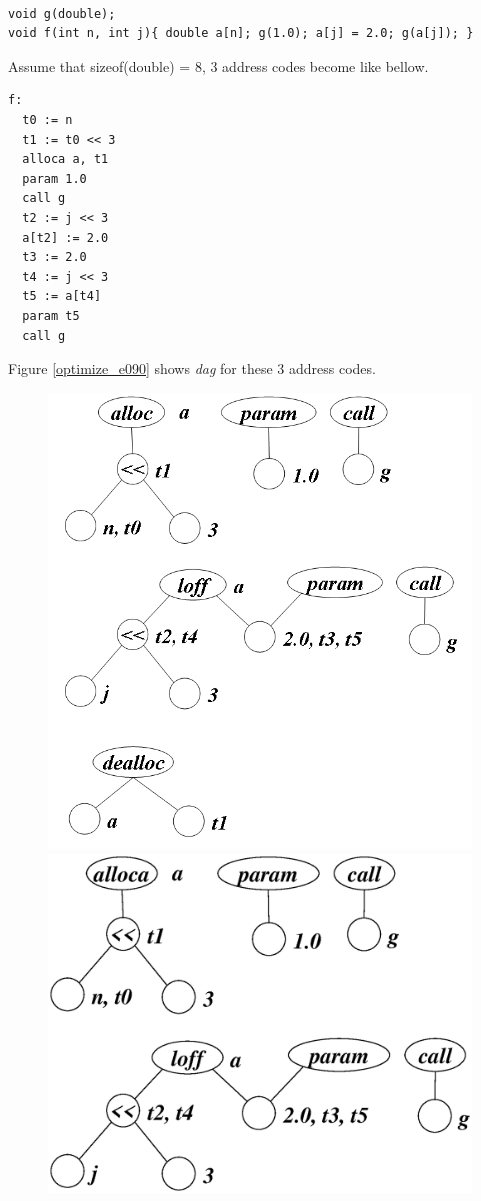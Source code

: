 \begin{Example}
\label{optimize_e089}
\begin{verbatim}

void g(double);
void f(int n, int j){ double a[n]; g(1.0); a[j] = 2.0; g(a[j]); }
\end{verbatim}
Assume that 
sizeof(double) = 8, 3 address codes become like bellow.
\begin{verbatim}
f:
  t0 := n
  t1 := t0 << 3
  alloca a, t1
  param 1.0
  call g
  t2 := j << 3
  a[t2] := 2.0
  t3 := 2.0
  t4 := j << 3
  t5 := a[t4]
  param t5
  call g
\end{verbatim}
Figure \ref{optimize_e090} shows {\em dag} for these 3 address codes.
\begin{figure}[htbp]
\begin{center}
\begin{htmlonly}
\includegraphics[width=0.392\linewidth,height=0.5\linewidth]{opt038.png}
\end{htmlonly}
\begin{latexonly}
\includegraphics[width=1.2\linewidth,height=1.0\linewidth]{opt038.eps}

\end{latexonly}
\end{center}
\end{figure}
\end{Example}
